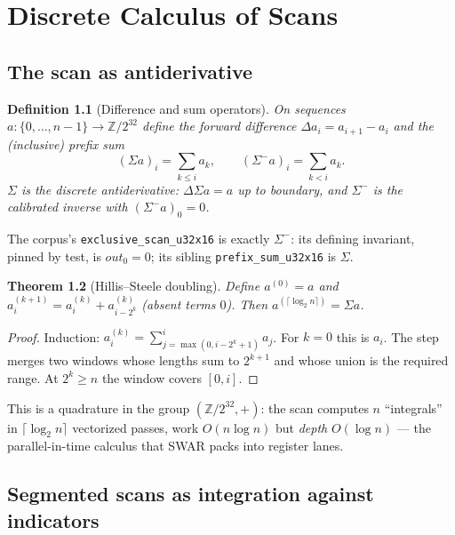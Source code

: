 \documentclass[11pt,a4paper]{report}
\newtheorem{theorem}{Theorem}[chapter]
\newtheorem{definition}[theorem]{Definition}
\newcommand{\Z}{\mathbb{Z}}
\begin{document}
\chapter{Discrete Calculus of Scans}

\section{The scan as antiderivative}

\begin{definition}[Difference and sum operators]
On sequences $a : \{0,\dots,n-1\} \to \Z/2^{32}$ define the forward
difference $\Delta a_i = a_{i+1} - a_i$ and the (inclusive) prefix sum
\begin{equation}
(\Sigma a)_i = \sum_{k \le i} a_k,
\qquad
(\Sigma^{-} a)_i = \sum_{k < i} a_k .
\end{equation}
$\Sigma$ is the discrete antiderivative: $\Delta \Sigma a = a$ up to
boundary, and $\Sigma^{-}$ is the calibrated inverse with
$(\Sigma^{-} a)_0 = 0$.
\end{definition}

The corpus's \texttt{exclusive\_scan\_u32x16} is exactly $\Sigma^{-}$:
its defining invariant, pinned by test, is $\mathit{out}_0 = 0$; its
sibling \texttt{prefix\_sum\_u32x16} is $\Sigma$.

\begin{theorem}[Hillis--Steele doubling]\label{thm:hs}
Define $a^{(0)} = a$ and
$a^{(k+1)}_i = a^{(k)}_i + a^{(k)}_{i - 2^k}$ (absent terms $0$).
Then $a^{(\lceil \log_2 n \rceil)} = \Sigma a$.
\end{theorem}

\begin{proof}
Induction: $a^{(k)}_i = \sum_{j=\max(0, i - 2^k + 1)}^{i} a_j$. For
$k=0$ this is $a_i$. The step merges two windows whose lengths sum to
$2^{k+1}$ and whose union is the required range. At
$2^k \ge n$ the window covers $[0, i]$.
\end{proof}

This is a quadrature in the group $(\Z/2^{32}, +)$: the scan computes
$n$ ``integrals'' in $\lceil\log_2 n\rceil$ vectorized passes, work
$O(n \log n)$ but \emph{depth} $O(\log n)$ --- the parallel-in-time
calculus that SWAR packs into register lanes.

\section{Segmented scans as integration against indicators}
\end{document}
